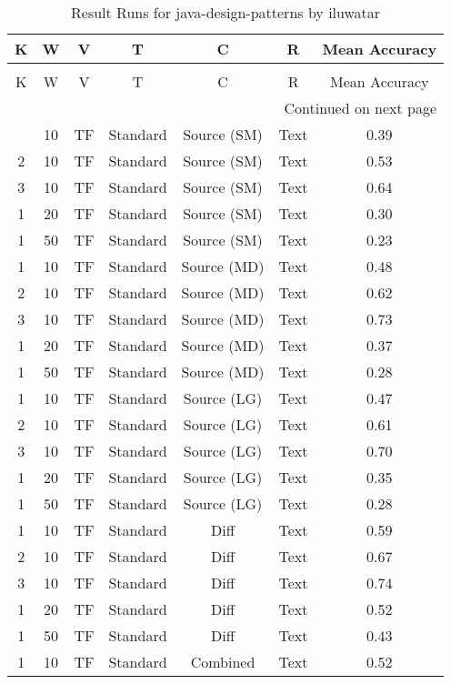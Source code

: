 \begin{longtable}{|c|c|c|c|c|c|c|}
\hline
K & W & V & T & C & R & Mean Accuracy \\
\hline
\endfirsthead
\caption[]{Continued from previous page} \\
\hline
K & W & V & T & C & R & Mean Accuracy \\
\hline
\endhead
\hline
\multicolumn{7}{r}{Continued on next page} \\
\endfoot
\hline
\caption{Result Runs for java-design-patterns by iluwatar} 
\label{result-runs-java-design-patterns-iluwatar}
\endlastfoot
1 & 10 & TF & Standard & Source (SM) & Text & 0.39 \\
\hline
2 & 10 & TF & Standard & Source (SM) & Text & 0.53 \\
\hline
3 & 10 & TF & Standard & Source (SM) & Text & 0.64 \\
\hline
1 & 20 & TF & Standard & Source (SM) & Text & 0.30 \\
\hline
1 & 50 & TF & Standard & Source (SM) & Text & 0.23 \\
\hline
1 & 10 & TF & Standard & Source (MD) & Text & 0.48 \\
\hline
2 & 10 & TF & Standard & Source (MD) & Text & 0.62 \\
\hline
3 & 10 & TF & Standard & Source (MD) & Text & 0.73 \\
\hline
1 & 20 & TF & Standard & Source (MD) & Text & 0.37 \\
\hline
1 & 50 & TF & Standard & Source (MD) & Text & 0.28 \\
\hline
1 & 10 & TF & Standard & Source (LG) & Text & 0.47 \\
\hline
2 & 10 & TF & Standard & Source (LG) & Text & 0.61 \\
\hline
3 & 10 & TF & Standard & Source (LG) & Text & 0.70 \\
\hline
1 & 20 & TF & Standard & Source (LG) & Text & 0.35 \\
\hline
1 & 50 & TF & Standard & Source (LG) & Text & 0.28 \\
\hline
1 & 10 & TF & Standard & Diff & Text & 0.59 \\
\hline
2 & 10 & TF & Standard & Diff & Text & 0.67 \\
\hline
3 & 10 & TF & Standard & Diff & Text & 0.74 \\
\hline
1 & 20 & TF & Standard & Diff & Text & 0.52 \\
\hline
1 & 50 & TF & Standard & Diff & Text & 0.43 \\
\hline
1 & 10 & TF & Standard & Combined & Text & 0.52 \\

\end{longtable}

